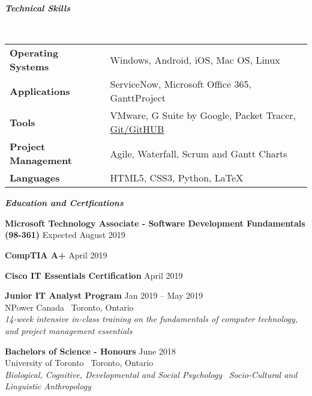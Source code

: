 \documentclass{article}
\begin{document}
\smallskip

\begin{center}
 \large \textcolor{ablue}{\textit{\textbf{Technical Skills}}}
\end{center}

~\begin{tabular}{l l}
 
\textbf{Operating Systems} & Windows,  Android,  iOS, Mac OS,  Linux  \\
\textbf{Applications} & ServiceNow,  Microsoft Office 365, GanttProject  \\
\textbf{Tools} & VMware, G Suite by Google, Packet Tracer, \href{https://github.com/cecil-a}{Git/GitHUB} \\
\textbf{Project Management} & Agile, Waterfall, Scrum and Gantt Charts \\
\textbf{Languages} & HTML5,  CSS3,  Python, LaTeX\\

\end{tabular}

\bigskip

\begin{center}
 \large  \textcolor{ablue}{\textit{\textbf{Education and Certfications}}}
\end{center}

\begin{doublespacing}

\noindent \textbf{Microsoft Technology Associate - Software Development Fundamentals (98-361)}
\hfill Expected August 2019 

\noindent \textbf{CompTIA A+}    
\hfill April 2019

\noindent \textbf{Cisco IT Essentials Certification}
\hfill April 2019 

\begin{singlespacing}

\noindent \textbf{Junior IT Analyst Program} 
\hfill Jan 2019 – May 2019 
\\\noindent NPower Canada \textbar \ {Toronto, Ontario }
\\\noindent  \textit{14-week intensive in-class training on the fundamentals of computer technology, and project management essentials}

\end{singlespacing}

\begin{singlespacing}

\noindent \textbf{Bachelors of Science - Honours} 
\hfill June 2018 
\\\noindent University of Toronto \textbar \ Toronto, Ontario
\\\noindent \textit{Biological, Cognitive, Developmental and Social Psychology} \textbar  \  \textit{Socio-Cultural and Linguistic Anthropology}

\end{singlespacing}

\end{doublespacing}
\end{document}
